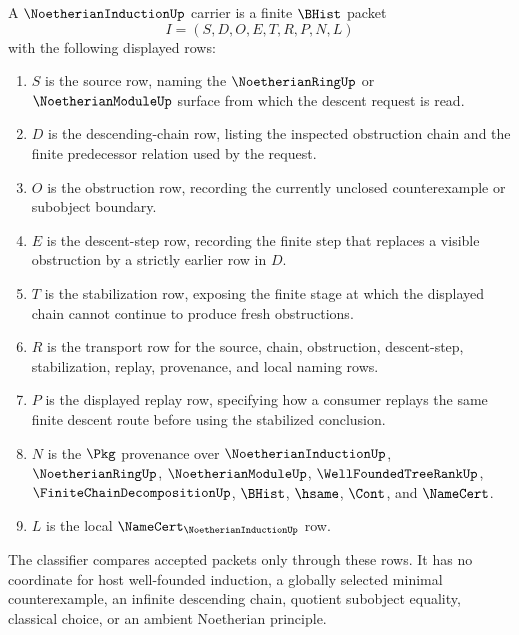 \begin{definition}
\label{def:noetherian-induction-carrier}
A $\NoetherianInductionUp$ carrier is a finite $\BHist$ packet
$$
I=(S,D,O,E,T,R,P,N,L)
$$
with the following displayed rows:
\begin{enumerate}
\item $S$ is the source row, naming the $\NoetherianRingUp$ or $\NoetherianModuleUp$ surface from which the descent request is read.
\item $D$ is the descending-chain row, listing the inspected obstruction chain and the finite predecessor relation used by the request.
\item $O$ is the obstruction row, recording the currently unclosed counterexample or subobject boundary.
\item $E$ is the descent-step row, recording the finite step that replaces a visible obstruction by a strictly earlier row in $D$.
\item $T$ is the stabilization row, exposing the finite stage at which the displayed chain cannot continue to produce fresh obstructions.
\item $R$ is the transport row for the source, chain, obstruction, descent-step, stabilization, replay, provenance, and local naming rows.
\item $P$ is the displayed replay row, specifying how a consumer replays the same finite descent route before using the stabilized conclusion.
\item $N$ is the $\Pkg$ provenance over $\NoetherianInductionUp$, $\NoetherianRingUp$, $\NoetherianModuleUp$, $\WellFoundedTreeRankUp$, $\FiniteChainDecompositionUp$, $\BHist$, $\hsame$, $\Cont$, and $\NameCert$.
\item $L$ is the local $\NameCert_{\NoetherianInductionUp}$ row.
\end{enumerate}
The classifier compares accepted packets only through these rows. It has no coordinate for host well-founded induction, a globally selected minimal counterexample, an infinite descending chain, quotient subobject equality, classical choice, or an ambient Noetherian principle.
\end{definition}

